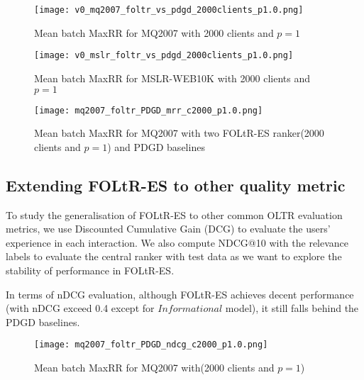 \begin{figure}[H]
	\centering
	\texttt{[image: v0\_mq2007\_foltr\_vs\_pdgd\_2000clients\_p1.0.png]}
	\caption{Mean batch MaxRR for MQ2007 with 2000 clients and $p = 1$}
	\label{fig: mq2007-v0-baseline}
\end{figure}

\begin{figure}[H]
	\centering
	\texttt{[image: v0\_mslr\_foltr\_vs\_pdgd\_2000clients\_p1.0.png]}
	\caption{Mean batch MaxRR for MSLR-WEB10K with 2000 clients and $p = 1$}
	\label{fig: mslr-v0-baseline}
\end{figure}

\begin{figure}[H]
	\centering
	\texttt{[image: mq2007\_foltr\_PDGD\_mrr\_c2000\_p1.0.png]}
	\caption{Mean batch MaxRR for MQ2007 with two FOLtR-ES ranker(2000 clients and $p = 1$) and PDGD baselines}
	\label{fig: mq2007-rq3}
\end{figure}


\subsection{Extending FOLtR-ES to other quality metric}


To study the generalisation of FOLtR-ES to other common OLTR evaluation metrics, we use Discounted Cumulative Gain (DCG) to evaluate the users' experience in each interaction. We also compute NDCG@10 with the relevance labels to evaluate the central ranker with test data as we want to explore the stability of  performance in FOLtR-ES.

In terms of nDCG evaluation, although FOLtR-ES achieves decent performance (with nDCG exceed 0.4 except for $Informational$ model), it still falls behind the PDGD baselines.

\begin{figure}[H]
	\centering
	\texttt{[image: mq2007\_foltr\_PDGD\_ndcg\_c2000\_p1.0.png]}
	\caption{Mean batch MaxRR for MQ2007 with(2000 clients and $p = 1$)}
	\label{fig: mq2007-rq4}
\end{figure}